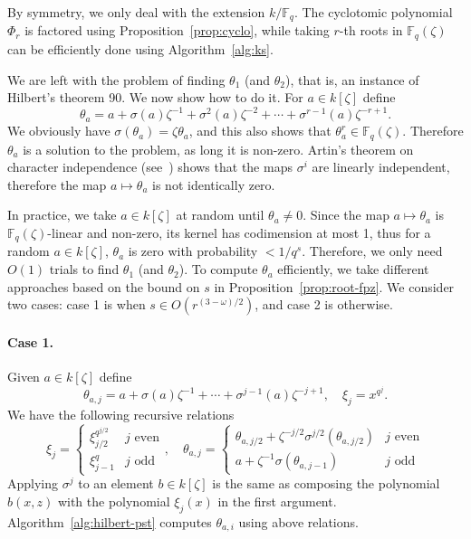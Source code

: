 \documentclass[12pt]{article}
\theoremstyle{plain}
\theoremstyle{definition}
\def\F{\ensuremath{\mathbb{F}}}
\begin{document}
By symmetry, we only deal with the extension $k / \F_q$.
The cyclotomic polynomial $\Phi_r$ is factored using Proposition~\ref{prop:cyclo}, while
taking $r$-th roots in $\F_q(\zeta)$ can be efficiently done using 
Algorithm~\ref{alg:ks}.

We are left with the problem of finding $\theta_1$ (and $\theta_2$), that is, an instance of Hilbert's theorem 90.
We now show how to do it. For $a \in k[\zeta]$ define
\[ \theta_a = a + \sigma(a)\zeta^{-1} + \sigma^2(a)\zeta^{-2} + \cdots + \sigma^{r - 1}(a)\zeta^{-r 
	+ 1}. \]
We obviously have $\sigma(\theta_a) = \zeta\theta_a$, and this also shows that $\theta_a^r \in \F_q(\zeta)$.
Therefore $\theta_a$ is a solution to the problem, as long it is non-zero. 
Artin's theorem on character independence (see~\cite[Ch VI, Theorem 4.1]{lang})
shows that the maps $\sigma^i$ are linearly 
independent, therefore the map $a\mapsto\theta_a$ is not identically zero. 

In practice, we take $a \in k[\zeta]$ at random until
$\theta_a\ne0$. Since the map $a\mapsto\theta_a$ is
$\F_q(\zeta)$-linear and non-zero, its kernel has codimension at most 1, thus for a
random $a \in k[\zeta]$, $\theta_a$ is zero with probability $< 1 / q^s$. Therefore, we only 
need $O(1)$ trials to find $\theta_1$ (and $\theta_2$).
To compute $\theta_a$ efficiently, we take 
different approaches based on the bound on $s$ in Proposition~\ref{prop:root-fpz}. We consider two 
cases: case 1 is when $s \in O(r^{(3 - \omega) / 2})$, and case 2 is otherwise. 

\paragraph{Case 1.}
Given $a \in k[\zeta]$ define 
\[ \theta_{a, j} = a + \sigma(a)\zeta^{-1} + \cdots + \sigma^{j - 1}(a)\zeta^{-j + 1}, \quad \xi_j 
= x^{q^j}. \]
We have the following recursive relations
\[
\xi_j = 
\begin{cases}
\xi_{j / 2}^{q^{j / 2}} & j \text{ even} \\
\xi_{j - 1}^q & j \text{ odd}
\end{cases}, \quad
\theta_{a, j} = 
\begin{cases}
\theta_{a, j / 2} + \zeta^{-j / 2}\sigma^{j / 2}(\theta_{a, j / 2})& j \text{ even} \\
a + \zeta^{-1}\sigma(\theta_{a, j - 1}) & j \text{ odd}
\end{cases}
\]
Applying $\sigma^j$ to an element $b \in k[\zeta]$ is the same as composing the polynomial $b(x, 
z)$ with the polynomial $\xi_j(x)$ in the first argument. Algorithm~\ref{alg:hilbert-pst} computes 
$\theta_{a, i}$ using above relations.
\end{document}
